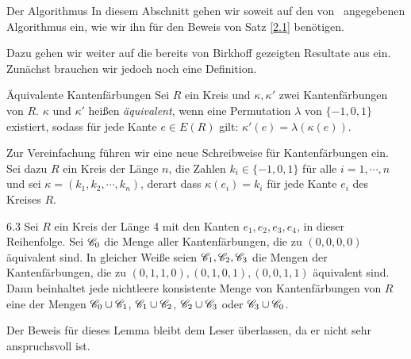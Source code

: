 \begin{section}{Der Algorithmus}
 In diesem Abschnitt gehen wir soweit auf den von \rsst\-\  angegebenen Algorithmus ein, wie wir ihn für den Beweis von Satz \ref{2.1} benötigen.
 
 Dazu gehen wir weiter auf die bereits von Birkhoff gezeigten Resultate aus \cite{AmJMath35} ein. Zunächst brauchen wir jedoch noch eine Definition.
 
 \begin{definition}{Äquivalente Kantenfärbungen}
  Sei $R$ ein Kreis und $\kappa,\kappa'$ zwei Kantenfärbungen von $R$. $\kappa$ und $\kappa'$ heißen \textit{äquivalent}, wenn eine Permutation $\lambda$ von $\{-1,0,1\}$ existiert, sodass für jede Kante $e\in E(R)$ gilt: $\kappa'(e) = \lambda(\kappa(e))$.
 \end{definition}

 Zur Vereinfachung führen wir eine neue Schreibweise für Kantenfärbungen ein. Sei dazu $R$ ein Kreis der Länge $n$, die Zahlen $k_i \in \{-1,0,1\}$ für alle $i = 1,\cdots,n$ und sei $\kappa = (k_1,k_2,\cdots,k_n)$, derart dass $\kappa(e_i) = k_i$ für jede Kante $e_i$ des Kreises $R$.
 
 \begin{lemmal}{ }{6.3}
  Sei $R$ ein Kreis der Länge 4 mit den Kanten $e_1,e_2,e_3,e_4$, in dieser Reihenfolge. Sei $\mathscr{C}_0$ die Menge aller Kantenfärbungen, die zu $(0,0,0,0)$ äquivalent sind. In gleicher Weiße seien $\mathscr{C}_1,\mathscr{C}_2,\mathscr{C}_3$ die Mengen der Kantenfärbungen, die zu $(0,1,1,0),(0,1,0,1),(0,0,1,1)$ äquivalent sind. Dann beinhaltet jede nichtleere konsistente Menge von Kantenfärbungen von $R$ eine der Mengen $\mathscr{C}_0 \cup \mathscr{C}_1$, $\mathscr{C}_1 \cup \mathscr{C}_2$, $\mathscr{C}_2 \cup \mathscr{C}_3$ oder $\mathscr{C}_3 \cup \mathscr{C}_0$.
 \end{lemmal}
 
 Der Beweis für dieses Lemma bleibt dem Leser überlassen, da er nicht sehr anspruchsvoll ist.
 

\end{section}
